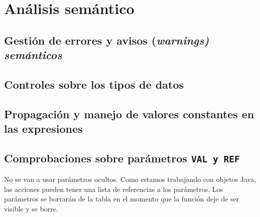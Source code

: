 \documentclass[../main.tex]{subfiles}
\begin{document}
\section{Análisis semántico}
\subsection{Gestión de errores y avisos (\it{warnings}) semánticos}

\subsection{Controles sobre los tipos de datos}

\subsection{Propagación y manejo de valores constantes en las expresiones}

\subsection{Comprobaciones sobre parámetros \tt{VAL} y \tt{REF}}


No se van a usar parámetros ocultos. Como estamos trabajando con objetos Java, las acciones pueden
tener una lista de referencias a los parámetros. Los parámetros se borrarán de la tabla en el
momento que la función deje de ser visible y se borre.
\end{document}
